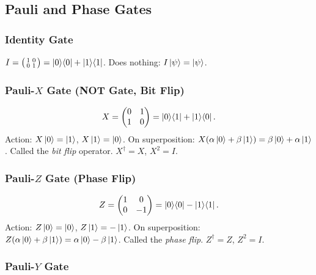 \documentclass[10pt,a4paper]{article}
\begin{document}
\subsection{Pauli and Phase Gates}

\subsubsection*{Identity Gate}
$I=\bigl(\begin{smallmatrix}1&0\\0&1\end{smallmatrix}\bigr)=\ket{0}\!\bra{0}+\ket{1}\!\bra{1}$. Does nothing: $I\ket{\psi}=\ket{\psi}$.

\subsubsection*{Pauli-$X$ Gate (NOT Gate, Bit Flip)}

\begin{tcolorbox}[defstyle, title={Definition: Pauli-$X$ Gate}]
\[
X = \begin{pmatrix}0&1\\1&0\end{pmatrix} = \ket{0}\!\bra{1}+\ket{1}\!\bra{0}.
\]
Action: $X\ket{0}=\ket{1}$, $X\ket{1}=\ket{0}$. On superposition: $X(\alpha\ket{0}+\beta\ket{1})=\beta\ket{0}+\alpha\ket{1}$. Called the \emph{bit flip} operator. $X^\dagger=X$, $X^2=I$.
\end{tcolorbox}

\subsubsection*{Pauli-$Z$ Gate (Phase Flip)}

\begin{tcolorbox}[defstyle, title={Definition: Pauli-$Z$ Gate}]
\[
Z = \begin{pmatrix}1&0\\0&-1\end{pmatrix} = \ket{0}\!\bra{0}-\ket{1}\!\bra{1}.
\]
Action: $Z\ket{0}=\ket{0}$, $Z\ket{1}=-\ket{1}$. On superposition: $Z(\alpha\ket{0}+\beta\ket{1})=\alpha\ket{0}-\beta\ket{1}$. Called the \emph{phase flip}. $Z^\dagger=Z$, $Z^2=I$.
\end{tcolorbox}

\subsubsection*{Pauli-$Y$ Gate}
\end{document}
